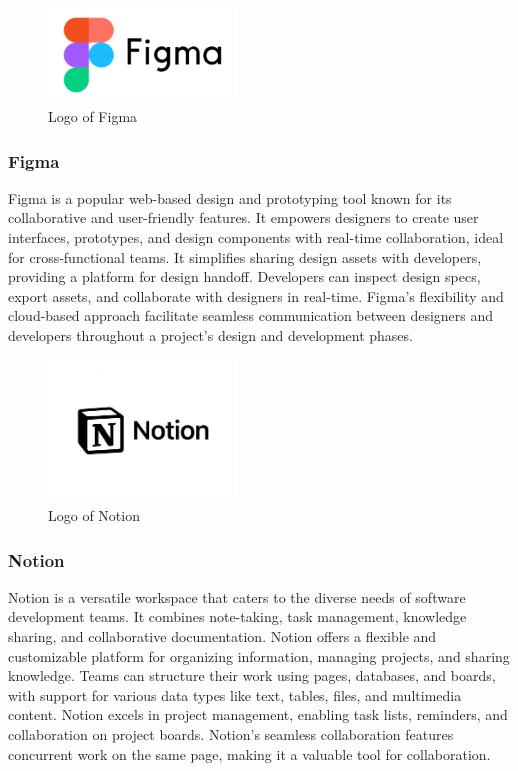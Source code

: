 \documentclass[conference]{IEEEtran}
\begin{document}
        \begin{figure}[htbp]
        \centerline{\includegraphics[width=5cm]{Images/logo/figma.png}}
        \label{fig}
        \caption{Logo of Figma}
        \end{figure}
        \subsubsection{Figma}
        Figma is a popular web-based design and prototyping tool known for its collaborative and user-friendly features. It empowers designers to create user interfaces, prototypes, and design components with real-time collaboration, ideal for cross-functional teams. It simplifies sharing design assets with developers, providing a platform for design handoff. Developers can inspect design specs, export assets, and collaborate with designers in real-time. Figma's flexibility and cloud-based approach facilitate seamless communication between designers and developers throughout a project's design and development phases.\\

        \begin{figure}[htbp]
        \centerline{\includegraphics[width=5cm]{Images/logo/notion.png}}
        \label{fig}
        \caption{Logo of Notion}
        \end{figure}
        \subsubsection{Notion}
        Notion is a versatile workspace that caters to the diverse needs of software development teams. It combines note-taking, task management, knowledge sharing, and collaborative documentation. Notion offers a flexible and customizable platform for organizing information, managing projects, and sharing knowledge. Teams can structure their work using pages, databases, and boards, with support for various data types like text, tables, files, and multimedia content. Notion excels in project management, enabling task lists, reminders, and collaboration on project boards. Notion's seamless collaboration features concurrent work on the same page, making it a valuable tool for collaboration.\\
\end{document}
